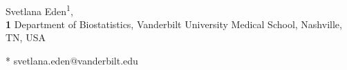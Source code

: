\documentclass[10pt,letterpaper]{article}
\begin{document}
\vspace*{0.2in}

\begin{flushleft}
{\Large
\textbf{} %
}
\newline
\\
Svetlana Eden\textsuperscript{1},
\\
\bigskip
\textbf{1} Department of Biostatistics, Vanderbilt University Medical School, Nashville, TN, USA
\bigskip

%
%
%
%

* svetlana.eden@vanderbilt.edu

\end{flushleft}
\end{document}
